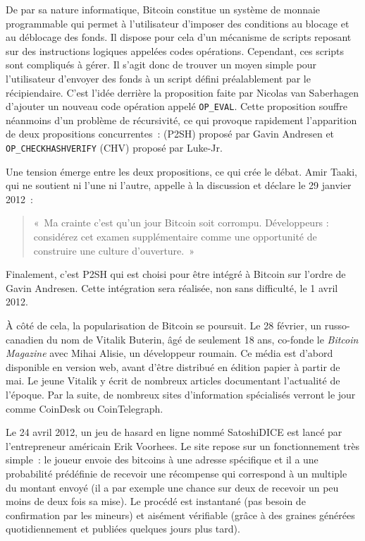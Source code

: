 De par sa nature informatique, Bitcoin constitue un système de monnaie programmable qui permet à l'utilisateur d'imposer des conditions au blocage et au déblocage des fonds. Il dispose pour cela d'un mécanisme de scripts reposant sur des instructions logiques appelées codes opérations. Cependant, ces scripts sont compliqués à gérer. Il s'agit donc de trouver un moyen simple pour l'utilisateur d'envoyer des fonds à un script défini préalablement par le récipiendaire. C'est l'idée derrière la proposition faite par Nicolas van Saberhagen d'ajouter un nouveau code opération appelé \verb?OP_EVAL?. Cette proposition souffre néanmoins d'un problème de récursivité, ce qui provoque rapidement l'apparition de deux propositions concurrentes~:  (P2SH) proposé par Gavin Andresen et \verb?OP_CHECKHASHVERIFY? (CHV) proposé par Luke-Jr.

Une tension émerge entre les deux propositions, ce qui crée le débat. Amir Taaki, qui ne soutient ni l'une ni l'autre, appelle à la discussion et déclare le 29 janvier 2012~:

\begin{quote}
«~Ma crainte c'est qu'un jour Bitcoin soit corrompu. Développeurs : considérez cet examen supplémentaire comme une opportunité de construire une culture d'ouverture.~»
\end{quote} 

Finalement, c'est P2SH qui est choisi pour être intégré à Bitcoin sur l'ordre de Gavin Andresen. Cette intégration sera réalisée, non sans difficulté, le 1\ier{} avril 2012.


À côté de cela, la popularisation de Bitcoin se poursuit. Le 28 février, un russo-canadien du nom de Vitalik Buterin, âgé de seulement 18 ans, co-fonde le \emph{Bitcoin Magazine} avec Mihai Alisie, un développeur roumain. Ce média est d'abord disponible en version web, avant d'être distribué en édition papier à partir de mai. Le jeune Vitalik y écrit de nombreux articles documentant l'actualité de l'époque. Par la suite, de nombreux sites d'information spécialisés verront le jour comme CoinDesk ou CoinTelegraph.

Le 24 avril 2012, un jeu de hasard en ligne nommé SatoshiDICE est lancé par l'entrepreneur américain Erik Voorhees. Le site repose sur un fonctionnement très simple~: le joueur envoie des bitcoins à une adresse spécifique et il a une probabilité prédéfinie de recevoir une récompense qui correspond à un multiple du montant envoyé (il a par exemple une chance sur deux de recevoir un peu moins de deux fois sa mise). Le procédé est instantané (pas besoin de confirmation par les mineurs) et aisément vérifiable (grâce à des graines générées quotidiennement et publiées quelques jours plus tard). 

